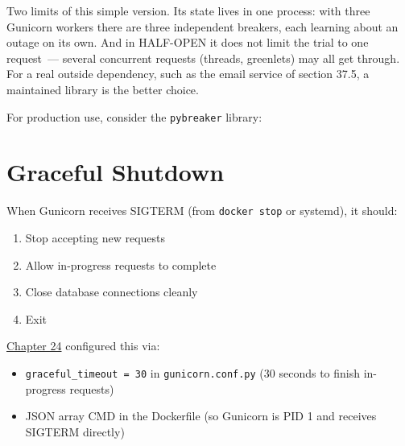\noindent{}Two limits of this simple version. Its state lives in one process: with three Gunicorn workers there are three independent breakers, each learning about an outage on its own. And in HALF-OPEN it does not limit the trial to one request~--- several concurrent requests (threads, greenlets) may all get through. For a real outside dependency, such as the email service of section 37.5, a maintained library is the better choice.

For production use, consider the \texttt{pybreaker} library:

\begin{codebox}[short]

\begin{Shaded}
\begin{Highlighting}[]
\end{Highlighting}
\end{Shaded}

\end{codebox}

\setcounter{section}{7}
\section{Graceful Shutdown}\label{37-reliability:378-graceful-shutdown}

When Gunicorn receives SIGTERM (from \texttt{docker\ stop} or systemd), it should:

\begin{enumerate}
\def\labelenumi{\arabic{enumi}.}
\tightlist
\item
  Stop accepting new requests
\item
  Allow in-progress requests to complete
\item
  Close database connections cleanly
\item
  Exit
\end{enumerate}

\noindent{}\hyperref[ch:24-process-startup]{Chapter 24} configured this via:

\begin{itemize}
\tightlist
\item
  \texttt{graceful\_timeout\ =}\allowbreak{}\texttt{\ 30} in \texttt{gunicorn.conf.py} (30 seconds to finish in-progress requests)
\item
  JSON array CMD in the Dockerfile (so Gunicorn is PID 1 and receives SIGTERM directly)
\end{itemize}

